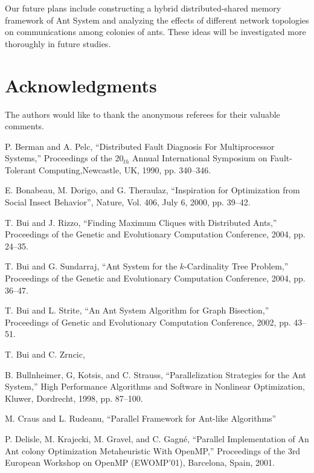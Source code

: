 \documentclass[11pt]{article}
\begin{document}
Our future plans include constructing a hybrid distributed-shared memory framework of Ant System and analyzing the effects of different network topologies on communications among colonies of ants. These ideas will be investigated more thoroughly in future studies.  

\section{Acknowledgments}

The authors would like to thank the anonymous referees for their valuable comments.


\begin{thebibliography}{99} 

P. Berman and A. Pelc, 
``Distributed Fault Diagnosis For Multiprocessor Systems,'' Proceedings of the 20$_{th}$ Annual International Symposium on Fault-Tolerant Computing,Newcastle, UK, 1990,  pp. 340--346.

E. Bonabeau, M. Dorigo, and G. Theraulaz, ``Inspiration for Optimization from Social Insect Behavior'', Nature, Vol. 406, July 6, 2000, pp. 39--42.

T. Bui and J. Rizzo, ``Finding Maximum Cliques with Distributed Ants,'' Proceedings of the Genetic and Evolutionary Computation Conference, 2004, pp. 24--35.

T. Bui  and G. Sundarraj,  ``Ant System for the $k$-Cardinality Tree Problem,'' Proceedings of the Genetic and Evolutionary Computation Conference, 2004, pp. 36--47.


T. Bui and L. Strite, ``An Ant System Algorithm for Graph Bisection,'' Proceedings of  Genetic and Evolutionary Computation Conference, 2002, pp. 43--51.

T. Bui and C. Zrncic, 

B. Bullnheimer, G, Kotsis, and C. Strauss, ``Parallelization Strategies for the Ant System,'' High Performance Algorithms and Software in Nonlinear Optimization, Kluwer, Dordrecht, 1998, pp. 87--100.

M. Craus  and L. Rudeanu, ``Parallel Framework for Ant-like Algorithms'' %

P. Delisle, M. Krajecki, M. Gravel, and C. Gagn\'e, ``Parallel Implementation of An Ant colony Optimization Metaheuristic With OpenMP,'' Proceedings of the 3rd European Workshop on OpenMP (EWOMP’01), Barcelona, Spain, 2001.



\end{thebibliography}
\end{document}
